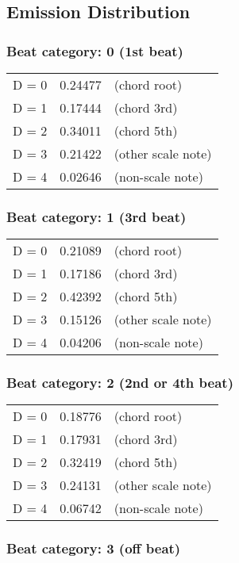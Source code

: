 \subsection{Emission Distribution}

\subsubsection*{Beat category: 0 (1st beat)}


\begin{tabular}{l l l}
D = 0 & 0.24477 & (chord root)\\
D = 1 & 0.17444 & (chord 3rd)\\
D = 2 & 0.34011 & (chord 5th)\\
D = 3 & 0.21422 & (other scale note)\\
D = 4 & 0.02646 & (non-scale note)\\
\end{tabular}


\subsubsection*{Beat category: 1 (3rd beat)}


\begin{tabular}{l l l}
D = 0 & 0.21089 & (chord root)\\
D = 1 & 0.17186 & (chord 3rd)\\
D = 2 & 0.42392 & (chord 5th)\\
D = 3 & 0.15126 & (other scale note)\\
D = 4 & 0.04206 & (non-scale note)\\
\end{tabular}


\subsubsection*{Beat category: 2 (2nd or 4th beat)}


\begin{tabular}{l l l}
D = 0 & 0.18776 & (chord root)\\
D = 1 & 0.17931 & (chord 3rd)\\
D = 2 & 0.32419 & (chord 5th)\\
D = 3 & 0.24131 & (other scale note)\\
D = 4 & 0.06742 & (non-scale note)\\
\end{tabular}


\subsubsection*{Beat category: 3 (off beat)}


